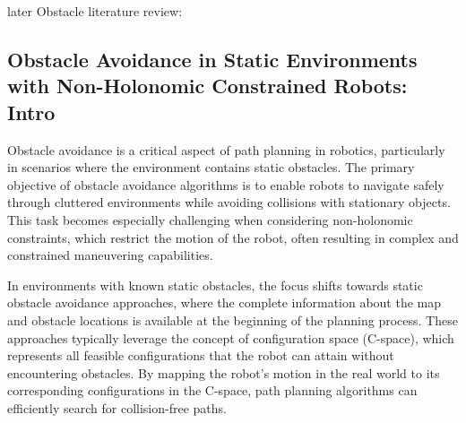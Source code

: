 







later Obstacle literature review:

\subsection{Obstacle Avoidance in Static Environments with Non-Holonomic Constrained Robots: Intro}


Obstacle avoidance is a critical aspect of path planning in robotics, particularly in scenarios where the environment contains static obstacles. The primary objective of obstacle avoidance algorithms is to enable robots to navigate safely through cluttered environments while avoiding collisions with stationary objects. This task becomes especially challenging when considering non-holonomic constraints, which restrict the motion of the robot, often resulting in complex and constrained maneuvering capabilities.

\vspace*{6mm}

In environments with known static obstacles, the focus shifts towards static obstacle avoidance approaches, where the complete information about the map and obstacle locations is available at the beginning of the planning process. These approaches typically leverage the concept of configuration space (C-space), which represents all feasible configurations that the robot can attain without encountering obstacles. By mapping the robot's motion in the real world to its corresponding configurations in the C-space, path planning algorithms can efficiently search for collision-free paths.

